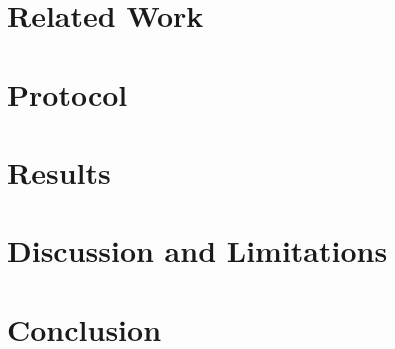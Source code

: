 \documentclass[10pt,twocolumn,letterpaper]{article}
\begin{document}
\section{Related Work}

\section{Protocol}

\section{Results}

\section{Discussion and Limitations}

\section{Conclusion}




\end{document}
